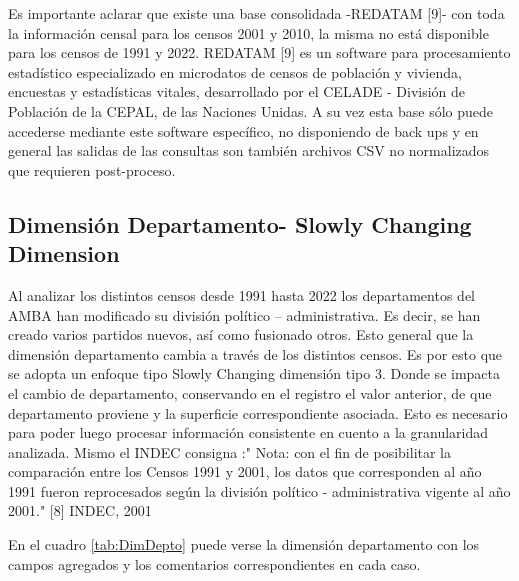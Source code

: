 \documentclass{article}
\theoremstyle{mytheoremstyle}
\theoremstyle{mytheoremstyle}
\theoremstyle{myproblemstyle}
\begin{document}
 Es importante aclarar que existe una base consolidada -REDATAM [9]- con toda la información censal para los censos 2001 y 2010, la misma no está disponible para los censos de 1991 y 2022. REDATAM [9] es un software para procesamiento estadístico especializado en microdatos de censos de población y vivienda, encuestas y estadísticas vitales, desarrollado por el CELADE  -  División de Población de la CEPAL, de las Naciones Unidas.  A su vez esta base sólo puede accederse mediante este software específico, no disponiendo de back ups y en general las salidas de las consultas son también archivos CSV no normalizados que requieren post-proceso.
 \subsection{Dimensión Departamento- Slowly Changing Dimension }
 Al analizar los distintos censos desde 1991 hasta 2022 los departamentos del AMBA han modificado su división político – administrativa. Es decir, se han creado varios partidos nuevos, así como fusionado otros. Esto general que la dimensión departamento cambia a través de los distintos censos. Es por esto que se adopta un enfoque tipo Slowly Changing dimensión tipo 3. Donde se impacta el cambio de departamento, conservando en el registro el valor anterior, de que departamento proviene y la superficie correspondiente asociada. Esto es necesario para poder luego procesar información consistente en cuento a la granularidad analizada. 
 Mismo el INDEC consigna :" Nota: con el fin de posibilitar la comparación entre los Censos 1991 y 2001, los datos que 
 corresponden al año 1991 fueron reprocesados según la división político - administrativa
 vigente al año 2001." [8] INDEC, 2001
 
 En el cuadro \ref{tab:DimDepto} puede verse la dimensión departamento con los campos agregados y los comentarios correspondientes en cada caso.
 
\end{document}
